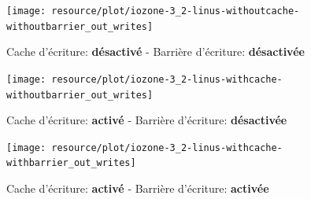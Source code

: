 \begin{figure}[H]
	\centering
	\texttt{[image: resource/plot/iozone-3\_2-linus-withoutcache-withoutbarrier\_out\_writes]}
	\caption{Cache d'écriture: \textbf{désactivé}   -   Barrière d'écriture: \textbf{désactivée}}
\end{figure}

\begin{figure}[H]
	\centering
	\texttt{[image: resource/plot/iozone-3\_2-linus-withcache-withoutbarrier\_out\_writes]}
	\caption{Cache d'écriture: \textbf{activé}   -   Barrière d'écriture: \textbf{désactivée}}
\end{figure}

\begin{figure}[H]
	\centering
	\texttt{[image: resource/plot/iozone-3\_2-linus-withcache-withbarrier\_out\_writes]}
	\caption{Cache d'écriture: \textbf{activé}   -   Barrière d'écriture: \textbf{activée}}
\end{figure}
